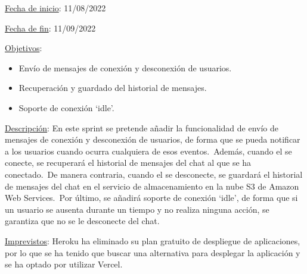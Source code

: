 
\underline{Fecha de inicio}: 11/08/2022

\underline{Fecha de fin}: 11/09/2022

\underline{Objetivos}:
\begin{itemize}
	\item Envío de mensajes de conexión y desconexión de usuarios.
	\item Recuperación y guardado del historial de mensajes.
	\item Soporte de conexión \enquote*{idle}.
\end{itemize}

\underline{Descripción}:
En este sprint se pretende añadir la funcionalidad de envío de mensajes de conexión y desconexión de usuarios, de
forma que se pueda notificar a los usuarios cuando ocurra cualquiera de esos eventos.\ Además, cuando el
 se conecte, se recuperará el historial de mensajes del chat al que se ha conectado.\ De
manera contraria, cuando el  se desconecte, se guardará el historial de mensajes del chat en
el servicio de almacenamiento en la nube S3 de Amazon Web Services.\ Por último, se añadirá soporte de conexión
\enquote*{idle}, de forma que si un usuario se ausenta durante un tiempo y no realiza ninguna acción, se garantiza
que no se le desconecte del chat.

\underline{Imprevistos}:
Heroku ha eliminado su plan gratuito de despliegue de aplicaciones, por lo que se ha tenido que buscar una
alternativa para desplegar la aplicación y se ha optado por utilizar Vercel.
